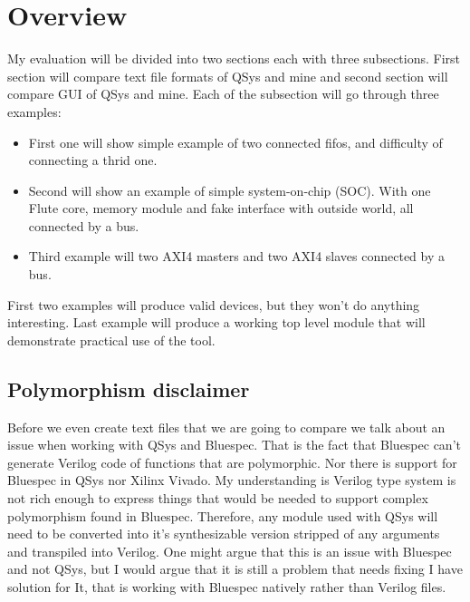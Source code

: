 \documentclass[14pt]{report}
\begin{document}
\section{Overview}
My evaluation will be divided into two sections each with three subsections. First section will compare text file formats of QSys and mine and second section will compare GUI of QSys and mine.
Each of the subsection will go through three examples:
\begin{itemize}
    \item First one will show simple example of two connected fifos, and difficulty of connecting a thrid one.
    \item Second will show an example of simple system-on-chip (SOC). With one Flute core, memory module and fake interface with outside world, all connected by a bus.
    \item Third example will two AXI4 masters and two AXI4 slaves connected by a bus. 
\end{itemize}
First two examples will produce valid devices, but they won't do anything interesting. Last example will produce a working top level module that will demonstrate practical use of the tool.

\subsection{Polymorphism disclaimer}
Before we even create text files that we are going to compare we talk about an issue when working with QSys and Bluespec. That is the fact that Bluespec can't generate Verilog code of functions that are polymorphic. Nor there is support for Bluespec in QSys nor Xilinx Vivado. My understanding is Verilog type system is not rich enough to express things that would be needed to support complex polymorphism found in Bluespec. Therefore, any module used with QSys will need to be converted into it's synthesizable version stripped of any arguments and transpiled into Verilog. One might argue that this is an issue with Bluespec and not QSys, but I would argue that it is still a problem that needs fixing I have solution for It, that is working with Bluespec natively rather than Verilog files. 
\end{document}

